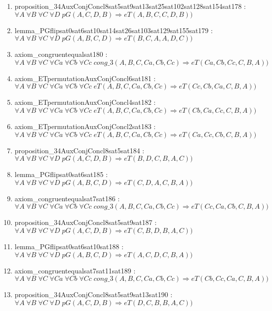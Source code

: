 \documentclass{article}
\begin{document}
\begin{enumerate}
\item proposition\_34AuxConjConcl8sat5sat9sat13sat25sat102sat128sat154sat178 : $\forall A\;\forall B\;\forall C\;\forall D\;pG(A, C, D, B) \Rightarrow eT(A, B, C, C, D, B))$
\item lemma\_PGflipsat0sat6sat10sat14sat26sat103sat129sat155sat179 : $\forall A\;\forall B\;\forall C\;\forall D\;pG(A, B, C, D) \Rightarrow eT(B, C, A, A, D, C))$
\item axiom\_congruentequalsat180 : $\forall A\;\forall B\;\forall C\;\forall Ca\;\forall Cb\;\forall Cc\;cong\_3(A, B, C, Ca, Cb, Cc) \Rightarrow eT(Ca, Cb, Cc, C, B, A))$
\item axiom\_ETpermutationAuxConjConcl6sat181 : $\forall A\;\forall B\;\forall C\;\forall Ca\;\forall Cb\;\forall Cc\;eT(A, B, C, Ca, Cb, Cc) \Rightarrow eT(Cc, Cb, Ca, C, B, A))$
\item axiom\_ETpermutationAuxConjConcl4sat182 : $\forall A\;\forall B\;\forall C\;\forall Ca\;\forall Cb\;\forall Cc\;eT(A, B, C, Ca, Cb, Cc) \Rightarrow eT(Cb, Ca, Cc, C, B, A))$
\item axiom\_ETpermutationAuxConjConcl2sat183 : $\forall A\;\forall B\;\forall C\;\forall Ca\;\forall Cb\;\forall Cc\;eT(A, B, C, Ca, Cb, Cc) \Rightarrow eT(Ca, Cc, Cb, C, B, A))$
\item proposition\_34AuxConjConcl8sat5sat184 : $\forall A\;\forall B\;\forall C\;\forall D\;pG(A, C, D, B) \Rightarrow eT(B, D, C, B, A, C))$
\item lemma\_PGflipsat0sat6sat185 : $\forall A\;\forall B\;\forall C\;\forall D\;pG(A, B, C, D) \Rightarrow eT(C, D, A, C, B, A))$
\item axiom\_congruentequalsat7sat186 : $\forall A\;\forall B\;\forall C\;\forall Ca\;\forall Cb\;\forall Cc\;cong\_3(A, B, C, Ca, Cb, Cc) \Rightarrow eT(Cc, Ca, Cb, C, B, A))$
\item proposition\_34AuxConjConcl8sat5sat9sat187 : $\forall A\;\forall B\;\forall C\;\forall D\;pG(A, C, D, B) \Rightarrow eT(C, B, D, B, A, C))$
\item lemma\_PGflipsat0sat6sat10sat188 : $\forall A\;\forall B\;\forall C\;\forall D\;pG(A, B, C, D) \Rightarrow eT(A, C, D, C, B, A))$
\item axiom\_congruentequalsat7sat11sat189 : $\forall A\;\forall B\;\forall C\;\forall Ca\;\forall Cb\;\forall Cc\;cong\_3(A, B, C, Ca, Cb, Cc) \Rightarrow eT(Cb, Cc, Ca, C, B, A))$
\item proposition\_34AuxConjConcl8sat5sat9sat13sat190 : $\forall A\;\forall B\;\forall C\;\forall D\;pG(A, C, D, B) \Rightarrow eT(D, C, B, B, A, C))$

\end{enumerate}
\end{document}
